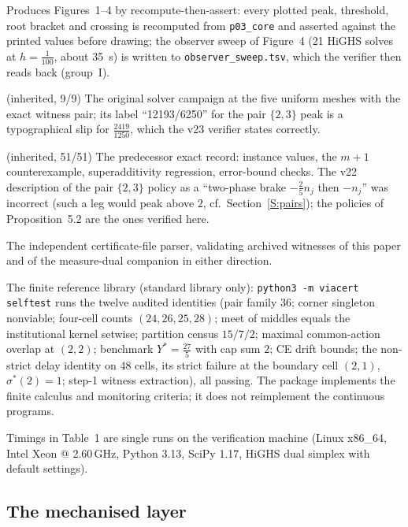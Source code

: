 \documentclass[11pt,a4paper]{article}
\theoremstyle{plain}
\theoremstyle{definition}
\theoremstyle{remark}
\newcommand{\tfr}[2]{\tfrac{#1}{#2}}
\begin{document}
\begin{description}[leftmargin=1.5em,itemsep=2pt]
\item[\texttt{make\_figs.py}] Produces Figures~1--4 by recompute-then-assert: every plotted peak, threshold, root bracket and crossing is recomputed from \texttt{p03\_core} and asserted against the printed values before drawing; the observer sweep of Figure~4 (21 HiGHS solves at $h=\tfr1{100}$, about 35~s) is written to \texttt{observer\_sweep.tsv}, which the verifier then reads back (group~I).
\item[\texttt{paper2c\_lp\_campaign.py}] (inherited, 9/9) The original solver campaign at the five uniform meshes with the exact witness pair; its label ``12193/6250'' for the pair $\{2,3\}$ peak is a typographical slip for $\tfr{2419}{1250}$, which the v23 verifier states correctly.
\item[\texttt{paper2\_nonstandard\_verification.py}] (inherited, 51/51) The predecessor exact record: instance values, the $m+1$ counterexample, superadditivity regression, error-bound checks. The v22 description of the pair $\{2,3\}$ policy as a ``two-phase brake $-\tfr25n_j$ then $-n_j$'' was incorrect (such a leg would peak above $2$, cf.\ Section~\ref{S:pairs}); the policies of Proposition~5.2 are the ones verified here.
\item[\texttt{certificate\_exchange\_v1.py}] The independent certificate-file parser, validating archived witnesses of this paper and of the measure-dual companion in either direction.
\item[\texttt{viacert/}] The finite reference library (standard library only): \texttt{python3 -m viacert selftest} runs the twelve audited identities (pair family 36; corner singleton nonviable; four-cell counts $(24,26,25,28)$; meet of middles equals the institutional kernel setwise; partition census $15/7/2$; maximal common-action overlap at $(2,2)$; benchmark $Y^\ast=\tfr{27}5$ with cap sum $2$; CE drift bounds; the non-strict delay identity on 48 cells, its strict failure at the boundary cell $(2,1)$, $\sigma^\ast(2)=1$; step-1 witness extraction), all passing. The package implements the finite calculus and monitoring criteria; it does not reimplement the continuous programs.
\end{description}

Timings in Table~1 are single runs on the verification machine (Linux x86\_64, Intel Xeon @ 2.60\,GHz, Python 3.13, SciPy 1.17, HiGHS dual simplex with default settings).

\subsection{The mechanised layer}
\end{document}
